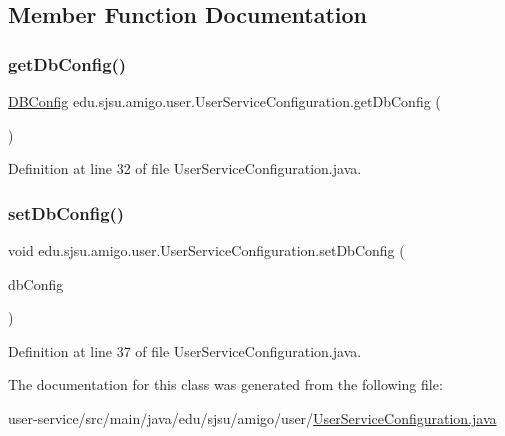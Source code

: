 \subsection{Member Function Documentation}
\mbox{\label{classedu_1_1sjsu_1_1amigo_1_1user_1_1_user_service_configuration_afb210dd7f90476733962c70c558ecba1}} 
\subsubsection{\texorpdfstring{get\+Db\+Config()}{getDbConfig()}}
{\footnotesize\ttfamily \hyperlink{classedu_1_1sjsu_1_1amigo_1_1user_1_1_d_b_config}{D\+B\+Config} edu.\+sjsu.\+amigo.\+user.\+User\+Service\+Configuration.\+get\+Db\+Config (\begin{DoxyParamCaption}{ }\end{DoxyParamCaption})}



Definition at line 32 of file User\+Service\+Configuration.\+java.

\mbox{\label{classedu_1_1sjsu_1_1amigo_1_1user_1_1_user_service_configuration_aff67b8696176b111418ebd1cfa6d2b83}} 
\subsubsection{\texorpdfstring{set\+Db\+Config()}{setDbConfig()}}
{\footnotesize\ttfamily void edu.\+sjsu.\+amigo.\+user.\+User\+Service\+Configuration.\+set\+Db\+Config (\begin{DoxyParamCaption}\item[{\hyperlink{classedu_1_1sjsu_1_1amigo_1_1user_1_1_d_b_config}{D\+B\+Config}}]{db\+Config }\end{DoxyParamCaption})}



Definition at line 37 of file User\+Service\+Configuration.\+java.



The documentation for this class was generated from the following file\+:\begin{DoxyCompactItemize}
\item 
user-\/service/src/main/java/edu/sjsu/amigo/user/\hyperlink{_user_service_configuration_8java}{User\+Service\+Configuration.\+java}\end{DoxyCompactItemize}

